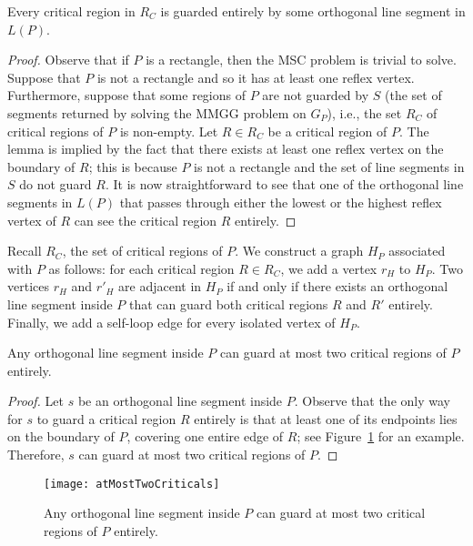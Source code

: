 \documentclass{llncs}
\begin{document}
\begin{lemma}
\label{lem:atLeastOneSegment}
Every critical region in $R_C$ is guarded entirely by some orthogonal line segment in $L(P)$.
\end{lemma}
\begin{proof}
Observe that if $P$ is a rectangle, then the MSC problem is trivial to solve. 
Suppose that $P$ is not a rectangle
and so it has at least one reflex vertex.
Furthermore, suppose that some regions of $P$ are not guarded by $S$ (the set of segments returned by
solving the MMGG problem on $G_P$), i.e., the set $R_C$ of critical regions of $P$ is non-empty.
Let $R\in R_C$ be a critical region of $P$. The lemma is implied by the fact that there exists at least one
reflex vertex on the boundary of $R$; this is because $P$ is not a rectangle and the set of line segments in
$S$ do not guard $R$. It is now
straightforward to see that one of the orthogonal line segments in $L(P)$ that passes through either the lowest or
the highest reflex vertex of $R$ can see the critical region $R$ entirely.
\end{proof}

Recall $R_C$, the set of critical regions of $P$. We construct a graph $H_P$ associated with $P$
as follows: for each critical region $R\in R_C$, we add a vertex $r_H$ to $H_P$. Two vertices
$r_H$ and $r'_H$ are adjacent in $H_P$ if and only if there exists an orthogonal line segment inside
$P$ that can guard both critical regions $R$ and $R'$ entirely. Finally, we add a self-loop edge for every
isolated vertex of $H_P$.



\begin{lemma}
\label{lem:atMostTwoCriticals}
Any orthogonal line segment inside $P$ can guard at most two critical regions of $P$ entirely.
\end{lemma}
\begin{proof}
Let $s$ be an orthogonal line segment inside $P$. Observe that the only way for $s$ to guard a critical region $R$ entirely is that at least
one of its endpoints lies on the boundary of $P$, covering one entire edge of $R$; see Figure~\ref{fig:atMostTwoCriticals} for an example.
Therefore, $s$ can guard at most two critical regions of $P$.
\end{proof}



\begin{figure}[t]
\centering \texttt{[image: atMostTwoCriticals]}
\caption{Any orthogonal line segment inside $P$ can guard at most two critical regions
of $P$ entirely.}
\label{fig:atMostTwoCriticals}\end{figure}
\end{document}
